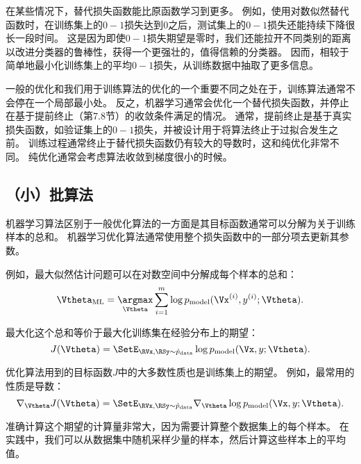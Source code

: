 
在某些情况下，替代损失函数能比原函数学习到更多。
例如，使用对数似然替代函数时，在训练集上的$0-1$损失达到$0$之后，测试集上的$0-1$损失还能持续下降很长一段时间。
这是因为即使$0-1$损失期望是零时，我们还能拉开不同类别的距离以改进分类器的鲁棒性，获得一个更强壮的，值得信赖的分类器。
因而，相较于简单地最小化训练集上的平均$0-1$损失，从训练数据中抽取了更多信息。

一般的优化和我们用于训练算法的优化的一个重要不同之处在于，训练算法通常不会停在一个局部最小处。
反之，机器学习通常会优化一个替代损失函数，并停止在基于提前终止（第7.8节）的收敛条件满足的情况。
通常，提前终止是基于真实损失函数，如验证集上的$0-1$损失，并被设计用于将算法终止于过拟合发生之前。
训练过程通常终止于替代损失函数仍有较大的导数时，这和纯优化非常不同。
纯优化通常会考虑算法收敛到梯度很小的时候。

\subsection{（小）批算法}
\label{sec:batch_and_minibatch_algorithms}
机器学习算法区别于一般优化算法的一方面是其目标函数通常可以分解为关于训练样本的总和。
机器学习优化算法通常使用整个损失函数中的一部分项去更新其参数。

例如，最大似然估计问题可以在对数空间中分解成每个样本的总和：
\begin{equation}
\label{eq:8.4}
    \Vtheta_{\text{ML}} = \underset{\Vtheta}{\argmax} \sum_{i=1}^m
    \log p_{\text{model}} (\Vx^{(i)}, y^{(i)}; \Vtheta) .
\end{equation}

最大化这个总和等价于最大化训练集在经验分布上的期望：
\begin{equation}
\label{eq:8.5}
    J(\Vtheta) = \SetE_{\RVx, \RSy \sim\hat{p}_\text{data}} 
    \log p_{\text{model}} (\Vx,y ; \Vtheta) .
\end{equation}


优化算法用到的目标函数$J$中的大多数性质也是训练集上的期望。
例如，最常用的性质是导数：
\begin{equation}
\label{eq:8.6}
    \nabla_{\Vtheta} J(\Vtheta) = \SetE_{\RVx, \RSy \sim\hat{p}_{\text{data}}} 
    \nabla_{\Vtheta} \log p_{\text{model}} (\Vx,y; \Vtheta) .
\end{equation}

准确计算这个期望的计算量非常大，因为需要计算整个数据集上的每个样本。
在实践中，我们可以从数据集中随机采样少量的样本，然后计算这些样本上的平均值。

